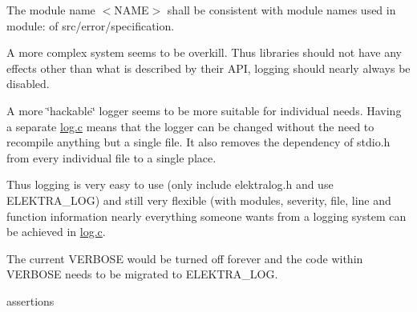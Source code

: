 The module name {\ttfamily $<$N\+A\+ME$>$} shall be consistent with module names used in {\ttfamily module\+:} of {\ttfamily src/error/specification}.

A more complex system seems to be overkill. Thus libraries should not have any effects other than what is described by their A\+PI, logging should nearly always be disabled.

A more \char`\"{}hackable\char`\"{} logger seems to be more suitable for individual needs. Having a separate {\ttfamily \mbox{\hyperlink{log_8c}{log.\+c}}} means that the logger can be changed without the need to recompile anything but a single file. It also removes the dependency of {\ttfamily stdio.\+h} from every individual file to a single place.

Thus logging is very easy to use (only include {\ttfamily elektralog.\+h} and use {\ttfamily E\+L\+E\+K\+T\+R\+A\+\_\+\+L\+OG}) and still very flexible (with modules, severity, file, line and function information nearly everything someone wants from a logging system can be achieved in {\ttfamily \mbox{\hyperlink{log_8c}{log.\+c}}}.

The current V\+E\+R\+B\+O\+SE would be turned off forever and the code within V\+E\+R\+B\+O\+SE needs to be migrated to {\ttfamily E\+L\+E\+K\+T\+R\+A\+\_\+\+L\+OG}.


\begin{DoxyItemize}
\item assertions
\end{DoxyItemize}